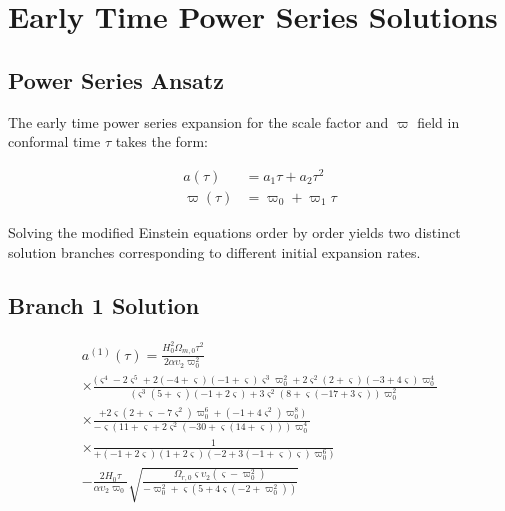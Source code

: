 \documentclass{article}
\begin{document}
\section{Early Time Power Series Solutions}

\subsection{Power Series Ansatz}

The early time power series expansion for the scale factor and $\varpi$ field in conformal time $\tau$ takes the form:

\begin{align}
a(\tau) &= a_1 \tau + a_2 \tau^2 \\
\varpi(\tau) &= \varpi_0 + \varpi_1 \tau
\end{align}

Solving the modified Einstein equations order by order yields two distinct solution branches corresponding to different initial expansion rates.

\subsection{Branch 1 Solution}

\begin{multline}
a^{(1)}(\tau) = \frac{H_0^2 \Omega_{m,0} \tau^2}{2 \alpha \upsilon_2 \varpi_0^2} \\
\times \frac{(\varsigma^4 - 2 \varsigma^5 + 2(-4 + \varsigma)(-1 + \varsigma) \varsigma^3 \varpi_0^2 + 2 \varsigma^2 (2 + \varsigma)(-3 + 4 \varsigma) \varpi_0^4}{(\varsigma^3 (5 + \varsigma)(-1 + 2 \varsigma) + 3 \varsigma^2 (8 + \varsigma(-17 + 3 \varsigma)) \varpi_0^2} \\
\times \frac{+ 2 \varsigma (2 + \varsigma - 7 \varsigma^2) \varpi_0^6 + (-1 + 4 \varsigma^2) \varpi_0^8)}{- \varsigma (11 + \varsigma + 2 \varsigma^2 (-30 + \varsigma (14 + \varsigma))) \varpi_0^4} \\
\times \frac{1}{+ (-1 + 2 \varsigma)(1 + 2 \varsigma)(-2 + 3(-1 + \varsigma) \varsigma) \varpi_0^6)} \\
- \frac{2 H_0 \tau}{\alpha \upsilon_2 \varpi_0} \sqrt{\frac{\Omega_{r,0} \varsigma \upsilon_2 (\varsigma - \varpi_0^2)}{-\varpi_0^2 + \varsigma (5 + 4 \varsigma (-2 + \varpi_0^2))}}
\end{multline}
\end{document}
